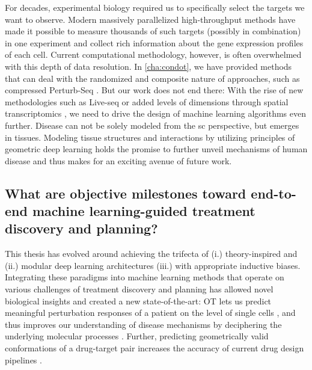 For decades, experimental biology required us to specifically select the targets we want to observe. Modern massively parallelized high-throughput methods have made it possible to measure thousands of such targets (possibly in combination) in one experiment and collect rich information about the gene expression profiles of each cell.
Current computational methodology, however, is often overwhelmed with this depth of data resolution.
In \cref{cha:condot}, we have provided methods that can deal with the randomized and composite nature of approaches, such as compressed Perturb-Seq \citep{dixit2016perturb, cleary2017efficient, cleary2020necessity, roohani2022gears}.
But our work does not end there: With the rise of new methodologies such as Live-seq \citep[\cref{sec:sbalign}]{chen2022live} or added levels of dimensions through spatial transcriptomics \citep{marx2021method}, we need to drive the design of machine learning algorithms even further. Disease can not be solely modeled from the \acrlong{sc} perspective, but emerges in tissues. Modeling tissue structures and interactions by utilizing principles of geometric deep learning \citep{fischer2023modeling} holds the promise to further unveil mechanisms of human disease and thus makes for an exciting avenue of future work.


\subsection*{\textbf{What are objective milestones toward end-to-end machine learning-guided treatment discovery and planning?}}

This thesis has evolved around achieving the trifecta of (i.) theory-inspired and (ii.) modular deep learning architectures (iii.) with appropriate inductive biases. Integrating these paradigms into machine learning methods that operate on various challenges of treatment discovery and planning has allowed novel biological insights and created a new state-of-the-art: \acrshort{OT} lets us predict meaningful perturbation responses of a patient on the level of single cells \citep{bunne2021learning, bunne2022supervised}, and thus improves our understanding of disease mechanisms by deciphering the underlying molecular processes \citep{bunne2022proximal, bunne2022recovering}. Further, predicting geometrically valid conformations of a drug-target pair increases the accuracy of current drug design pipelines \citep{somnath2021multi, ganea2022independent, somnath2023aligned}. \\

